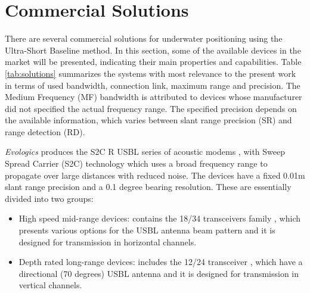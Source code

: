 %



\section{Commercial Solutions}

There are several commercial solutions for underwater positioning using the Ultra-Short Baseline method. In this section, some of the available devices in the market will be presented, indicating their main properties and capabilities. Table \ref{tab:solutions} summarizes the systems with most relevance to the present work in terms of used bandwidth, connection link, maximum range and precision. The Medium Frequency (MF) bandwidth is attributed to devices whose manufacturer did not specified the actual frequency range. The specified precision depends on the available information, which varies between slant range precision (SR) and range detection (RD).

\textit{Evologics} produces the S2C R USBL series of acoustic modems \cite{evologics1}, with Sweep Spread Carrier (S2C) technology \cite{evologics2} which uses a broad frequency range to propagate over large distances with reduced noise. The devices have a fixed 0.01m slant range precision and a 0.1 degree bearing resolution. These are essentially divided into two groups:
\begin{itemize}
	\item High speed mid-range devices: contains the 18/34 transceivers family \cite{evologics3}, which presents various options for the USBL antenna beam pattern and it is designed for transmission in horizontal channels.
	\item Depth rated long-range devices: includes the 12/24 transceiver \cite{evologics4}, which have a directional (70 degrees) USBL antenna  and it is designed for transmission in vertical channels.
\end{itemize}

